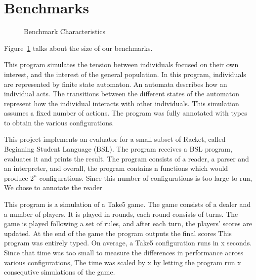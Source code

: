 \section{Benchmarks}

\begin{figure}
  \caption{Benchmark Characteristics}
  \label{fig:benchmark}
\end{figure}



 Figure~\ref{fig:benchmark} talks about the size of our benchmarks.

This program simulates the tension between individuals focused on their own interest, and the interest of the general population.
In this program, individuals are represented by finite state automaton. An automata describes how an individual acts. The transitions between
the different states of the automaton represent how the individual interacts with other individuals. This simulation assumes a fixed number of
actions. The program was fully annotated with types to obtain the various configurations.

This project implements an evaluator for a small subset of Racket, called Beginning Student Language (BSL).
The program receives a BSL program, evaluates it and prints the result. The program consists of a reader, a parser
and an interpreter, and overall, the program contains n functions which would produce $2^n$ configurations.
Since this number of configurations is too large to run, We chose to annotate  the reader  

This program is a simulation  of  a Take5 game. The game consists of a dealer
and a number of players. It  is played in rounds, each round consists of turns.
The game is played following a set of rules, and after each turn, the players'
scores are updated. At the end of the game the program outputs the final scores
This program was entirely typed. On average, a Take5 configuration runs in x
seconds. Since that time was too small to measure the differences in performance
across various configurations, The time was scaled by x by letting the program  run x consequtive  simulations
of the  game.


